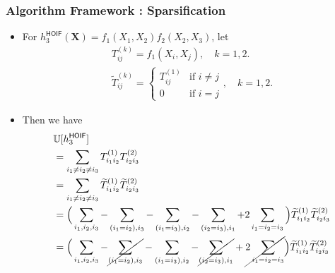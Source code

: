 \documentclass[9pt]{beamer}
\def\tilde{\widetilde}
\theoremstyle{mystyle}
\theoremstyle{mystyletwo}
\def\tilde{\widetilde}
\begin{document}
\begin{frame}
    \frametitle{Algorithm Framework : Sparsification}
   
    \begin{itemize}
           \item For $h^{\mathsf{HOIF}}_3(\bm{X}) = f_1(X_1,X_2) f_2(X_2,X_3) $, let 
            \begin{align*}
            T^{(k)}_{ij} = f_1(X_i,X_j), \quad k = 1,2. \\
            \tilde{T}^{(k)}_{ij} = 
            \begin{cases} 
            T^{(1)}_{ij} & \text{if } i \neq j \\
            0 & \text{if } i = j 
            \end{cases}, \quad k = 1,2.
            \end{align*}
            \item Then we have 
        \begin{align*}
            & \mathbb{U}[h^{\mathsf{HOIF}}_3] \\
            & = \sum_{i_1 \neq i_2 \neq i_3} T^{(1)}_{i_1i_2}  T^{(2)}_{i_2i_3} \\
            & = \sum_{i_1 \neq i_2 \neq i_3} \tilde{T}^{(1)}_{i_1i_2}  \tilde{T}^{(2)}_{i_2i_3} \\
     & = \Big(\sum_{i_1,i_2,i_3} - \sum_{(i_1=i_2), i_3 } - \sum_{(i_1=i_3), i_2 } - \sum_{(i_2=i_3), i_1 } + 2 \sum_{i_1=i_2=i_3}\Big) \tilde{T}^{(1)}_{i_1i_2}  \tilde{T}^{(2)}_{i_2i_3} \\
    & = \Big(\sum_{i_1,i_2,i_3} -\cancel{ \sum_{(i_1=i_2), i_3 }} - \sum_{(i_1=i_3), i_2 } - \cancel{\sum_{(i_2=i_3), i_1 }} +  \cancel{2 \sum_{i_1=i_2=i_3}} \Big) \tilde{T}^{(1)}_{i_1i_2}  \tilde{T}^{(2)}_{i_2i_3} \\
        \end{align*}
    \end{itemize}
\end{frame}
\end{document}
